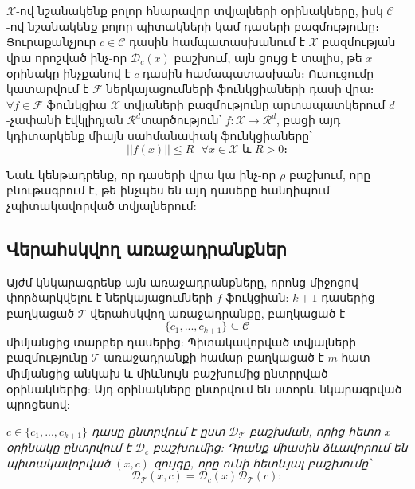 \documentclass[11pt]{article}
\begin{document}
\section*{\hfill 
 \hfill} \noindent
{}
{}
 
 $\mathcal{X}$-ով նշանակենք բոլոր հնարավոր տվյալների օրինակները, իսկ $\mathcal{C}$-ով նշանակենք բոլոր պիտակների կամ դասերի բազմությունը։ Յուրաքանչյուր $c \in \mathcal{C}$ դասին համպատասխանում է $\mathcal{X}$ բազմության վրա որոշված ինչ-որ $\mathcal{D}_c(x)$ բաշխում, այն ցույց է տալիս, թե $x$ օրինակը ինչքանով է $c$ դասին համապատասխան։ Ուսուցումը կատարվում է $\mathcal{F}$ ներկայացումների ֆունկցիաների դասի վրա։ $\forall f \in \mathcal{F}$  ֆունկցիա $\mathcal{X}$ տվյաների բազմությունը արտապատկերում $d$-չափանի էվկլիդյան $\mathcal{R}^d$տարծություն՝ $f:\mathcal{X}\rightarrow\mathcal{R}^d$, բացի այդ կդիտարկենք միայն սահմանափակ ֆունկցիաները՝
 $$||f(x)|| \leq R \text{    } \forall x \in \mathcal{X} \text{ և } R > 0։$$ 


\noindent Նաև կենթադրենք, որ դասերի վրա կա ինչ-որ $\rho$ բաշխում, որը բնութագրում է, թե ինչպես են այդ դասերը հանդիպում չպիտակավորված տվյալներում:

\subsection*{Վերահսկվող առաջադրանքներ}

\par Այժմ կնկարագրենք այն առաջադրանքները, որոնց միջոցով փորձարկվելու է ներկայացումների $f$ ֆուկցիան: $k+1$ դասերից բաղկացած $\mathcal{T}$ վերահսկվող առաջադրանքը, բաղկացած է $$\{c_1, ..., c_{k+1}\} \subseteq \mathcal{C}$$
միմյանցից տարբեր դասերից: Պիտակավորված տվյալների բազմությունը $\mathcal{T}$ առաջադրանքի համար բաղկացած է $m$ հատ միմյանցից անկախ և միևնույն բաշխումից ընտրրված օրինակներից: Այդ օրինակները ընտրվում են ստորև նկարագրված պրոցեսով:

\textit{$c \in \{c_1, ..., c_{k+1}\} $   դասը ընտրվում է ըստ $\mathcal{D}_{\mathcal{T}}$ բաշխման, որից հետո $x$ օրինակը ընտրվում է $\mathcal{D}_c$ բաշխումից: Դրանք միասին ձևավորում են պիտակավորված $(x, c)$ զույգը, որը ունի հետևյալ բաշխումը՝
$$\mathcal{D}_{\mathcal{T}} (x, c) = \mathcal{D}_{c}(x)\mathcal{D}_{\mathcal{T}}(c):$$}
\end{document}
